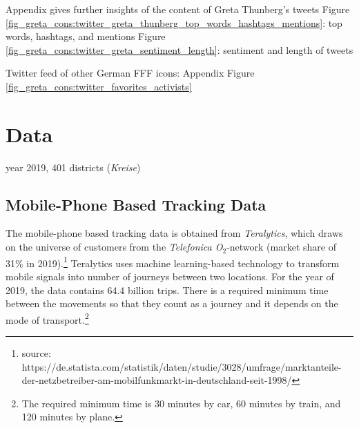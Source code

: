 \documentclass[11pt, a4paper]{article} %
\begin{document}
Appendix gives further insights of the content of Greta Thunberg's tweets
Figure \ref{fig_greta_cons:twitter_greta_thunberg_top_words_hashtags_mentions}: top words, hashtags, and mentions
Figure \ref{fig_greta_cons:twitter_greta_sentiment_length}: sentiment and length of tweets


Twitter feed of other German FFF icons: Appendix Figure \ref{fig_greta_cons:twitter_favorites_activists}
















\newpage
\section{Data}\label{sec_greta_cons:data} 

year 2019, 401 districts (\textit{Kreise})



\subsection{Mobile-Phone Based Tracking Data}

The mobile-phone based tracking data is obtained from \textit{Teralytics}, which draws on the universe of customers from the \textit{Telefonica O$_2$}-network (market share of 31\% in 2019).\footnote{source: https://de.statista.com/statistik/daten/studie/3028/umfrage/marktanteile-der-netzbetreiber-am-mobilfunkmarkt-in-deutschland-seit-1998/} Teralytics uses machine learning-based technology to transform mobile signals into number of journeys between two locations. For the year of 2019, the data contains 64.4 billion trips. There is a required minimum time between the movements so that they count as a journey and it depends on the mode of transport.\footnote{The required minimum time is 30 minutes by car, 60 minutes by train, and 120 minutes by plane.} 
\end{document}

